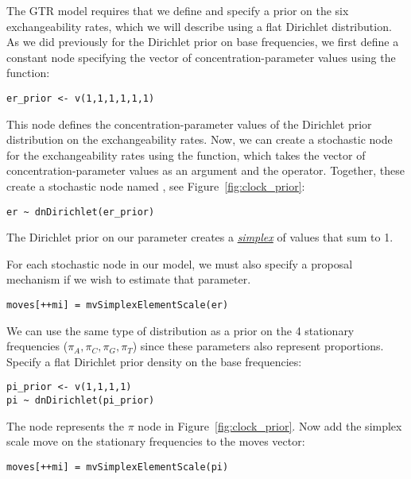 The GTR model requires that we define and specify a prior on the six exchangeability rates, which we will describe using a flat Dirichlet distribution.
As we did previously for the Dirichlet prior on base frequencies, we first define a constant node specifying the vector of concentration-parameter values using the  function:
{\tt \begin{snugshade*}
\begin{lstlisting}
er_prior <- v(1,1,1,1,1,1) 
\end{lstlisting}
\end{snugshade*}}
This node defines the concentration-parameter values of the Dirichlet prior distribution on the exchangeability rates. 
Now, we can create a stochastic node for the exchangeability rates using the  function, which takes the vector of concentration-parameter values as an argument and the \cl{\rbdn} operator. 
Together, these create a stochastic node named , see Figure~\ref{fig:clock_prior}: 
{\tt \begin{snugshade*}
\begin{lstlisting}
er ~ dnDirichlet(er_prior)
\end{lstlisting}
\end{snugshade*}}
The Dirichlet prior on our parameter  creates a \href{http://en.wikipedia.org/wiki/Simplex}{\textit{simplex}} of values that sum to 1. 


For each stochastic node in our model, we must also specify a proposal mechanism if we wish to estimate that parameter. 
{\tt\small \begin{snugshade*}
\begin{lstlisting}
moves[++mi] = mvSimplexElementScale(er) 
\end{lstlisting}
\end{snugshade*}}

We can use the same type of distribution as a prior on the 4 stationary frequencies ($\pi_A, \pi_C, \pi_G, \pi_T$) since these parameters also represent proportions. 
Specify a flat Dirichlet prior density on the base frequencies:
{\tt \begin{snugshade*}
\begin{lstlisting}
pi_prior <- v(1,1,1,1) 
pi ~ dnDirichlet(pi_prior)
\end{lstlisting}
\end{snugshade*}}

The node  represents the $\pi$ node in Figure~\ref{fig:clock_prior}.
Now add the simplex scale move on the stationary frequencies to the moves vector:
{\tt \small \begin{snugshade*}
\begin{lstlisting}
moves[++mi] = mvSimplexElementScale(pi)  
\end{lstlisting}
\end{snugshade*}}

